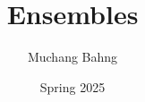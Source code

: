 \documentclass{article}
\begin{document}
\title{Ensembles}
\author{Muchang Bahng}
\date{Spring 2025}

\maketitle
\tableofcontents
\pagebreak












\end{document}
